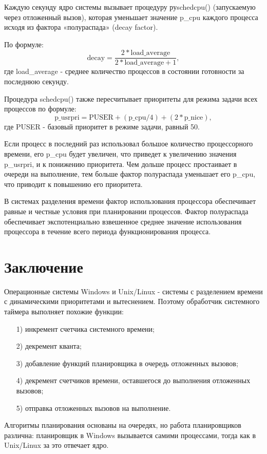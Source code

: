 \documentclass[14pt, a4paper]{extarticle}
\begin{document}
 	Каждую секунду ядро системы вызывает процедуру руschedcpu() (запускаемую
 	через отложенный вызов), которая уменьшает значение p\_cpu каждого процесса
 	исходя из фактора «полураспада» (decay factor).\par
 	
 	По формуле:
 	\begin{equation*}
 		\text{decay} = \frac{2 * \text{load\_average}}{2 * \text{load\_average} + 1},
 	\end{equation*}
 	\noindent где load\_average - среднее количество процессов в состоянии готовности за последнюю секунду. \par
 	Процедура schedcpu() также пересчитывает приоритеты для режима задачи всех
 	процессов по формуле: 
 	\begin{equation*}
 		\text{p\_usrpri} = \text{PUSER} + (\text{p\_cpu} / 4) + (2 * \text{p\_nice}),
 	\end{equation*}
 	\noindent где PUSER - базовый приоритет в режиме задачи, равный 50.
 	
 	Если процесс в последний раз использовал большое количество процессорного времени, его p\_cpu будет увеличен, что приведет к увеличению значения p\_usrpri, и к понижению приоритета. Чем дольше процесс простаивает в очереди на выполнение, тем больше фактор полураспада уменьшает его p\_cpu, что приводит к повышению его приоритета.\par
 	В системах разделения времени фактор использования процессора обеспечивает равные и честные условия при планировании процессов. Фактор полураспада обеспечивает экспотенциально взвешенное среднее
 	значение использования процессора в течение всего периода функционирования процесса.
 	
 	\clearpage
 	\section{Заключение}
 	Операционные системы Windows и Unix/Linux - системы с разделением времени с динамическими приоритетами и вытеснением. Поэтому обработчик системного таймера выполняет похожие функции:
 	\begin{itemize}
 		\item[1)] инкремент счетчика системного времени;
 		\item[2)] декремент кванта;
 		\item[3)] добавление функций планировщика в очередь отложенных вызовов;
 		\item[4)] декремент счетчиков времени, оставшегося до выполнения отложенных вызовов;
 		\item[5)] отправка отложенных вызовов на выполнение.		
 	\end{itemize}
 	 	
	Алгоритмы планирования основаны на очередях, но работа планировщиков различна:
	планировщик в Windows вызывается самими процессами, тогда как в Unix/Linux за это отвечает ядро. 	
 
\end{document}
